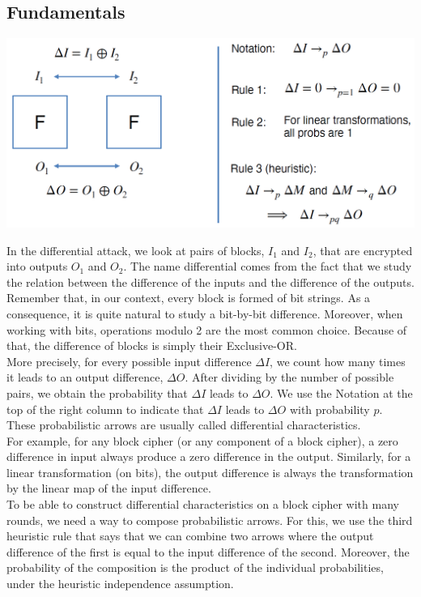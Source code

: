	\subsection{Fundamentals}
		\begin{center}
			\includegraphics[width=140mm]{Graphics/Cryptanalysis/c4.png}
		\end{center}
		In the differential attack, we look at pairs of blocks, $I_1$ and $I_2$, that are encrypted into outputs $O_1$ and $O_2$. 
		The name differential comes from the fact that we study the relation between the difference of the inputs and the difference of the outputs. 
		Remember that, in our context, every block is formed of bit strings. 
		As a consequence, it is quite natural to study a bit-by-bit difference. 
		Moreover, when working with bits, operations modulo 2 are the most common choice. 
		Because of that, the difference of blocks is simply their Exclusive-OR.\\
		More precisely, for every possible input difference $\Delta I$, we count how many times it leads to an output difference, $\Delta O$. 
		After dividing by the number of possible pairs, we obtain the probability that $\Delta I$ leads to $\Delta O$. 
		We use the Notation at the top of the right column to indicate that $\Delta I$ leads to $\Delta O$ with probability $p$. 
		These probabilistic arrows are usually called differential characteristics.\\
		For example, for any block cipher (or any component of a block cipher), a zero difference in input always produce a zero difference in the output. 
		Similarly, for a linear transformation (on bits), the output difference is always the transformation by the linear map of the input difference.\\
		To be able to construct differential characteristics on a block cipher with many rounds, we need a way to compose probabilistic arrows. 
		For this, we use the third heuristic rule that says that we can combine two arrows where the output difference of the first is equal to the input difference of the second. 
		Moreover, the probability of the composition is the product of the individual probabilities, under the heuristic independence assumption.
	
